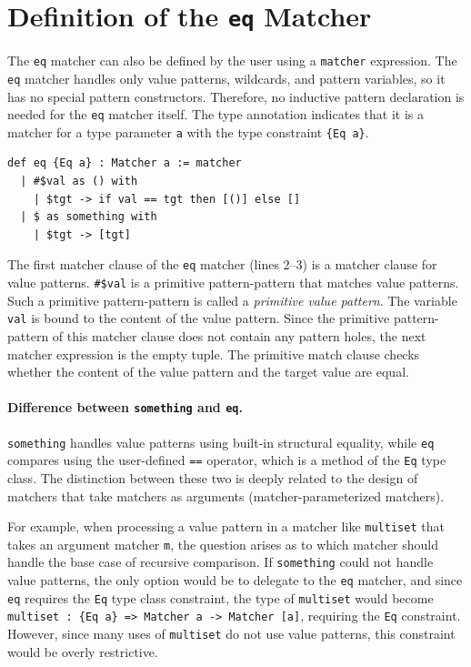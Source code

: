 \section{Definition of the \texttt{eq} Matcher}\label{matcher-eq}

The \lstinline{eq} matcher can also be defined by the user using a \lstinline{matcher} expression.
The \lstinline{eq} matcher handles only value patterns, wildcards, and pattern variables, so it has no special pattern constructors.
Therefore, no inductive pattern declaration is needed for the \lstinline{eq} matcher itself.
The type annotation indicates that it is a matcher for a type parameter \lstinline{a} with the type constraint \lstinline|{Eq a}|.
\begin{lstlisting}[language=egison]
def eq {Eq a} : Matcher a := matcher
  | #$val as () with
    | $tgt -> if val == tgt then [()] else []
  | $ as something with
    | $tgt -> [tgt]
\end{lstlisting}
The first matcher clause of the \lstinline{eq} matcher (lines 2--3) is a matcher clause for value patterns.
\lstinline{#$val} is a primitive pattern-pattern that matches value patterns.
Such a primitive pattern-pattern is called a \emph{primitive value pattern}.
The variable \lstinline{val} is bound to the content of the value pattern.
Since the primitive pattern-pattern of this matcher clause does not contain any pattern holes, the next matcher expression is the empty tuple.
The primitive match clause checks whether the content of the value pattern and the target value are equal.

\paragraph{Difference between \texttt{something} and \texttt{eq}.}
\lstinline{something} handles value patterns using built-in structural equality, while \lstinline{eq} compares using the user-defined \lstinline{==} operator, which is a method of the \lstinline{Eq} type class.
The distinction between these two is deeply related to the design of matchers that take matchers as arguments (matcher-parameterized matchers).

For example, when processing a value pattern in a matcher like \lstinline{multiset} that takes an argument matcher \lstinline{m}, the question arises as to which matcher should handle the base case of recursive comparison.
If \lstinline{something} could not handle value patterns, the only option would be to delegate to the \lstinline{eq} matcher, and since \lstinline{eq} requires the \lstinline{Eq} type class constraint, the type of \lstinline{multiset} would become
\lstinline|multiset : {Eq a} => Matcher a -> Matcher [a]|,
requiring the \lstinline{Eq} constraint.
However, since many uses of \lstinline{multiset} do not use value patterns, this constraint would be overly restrictive.

